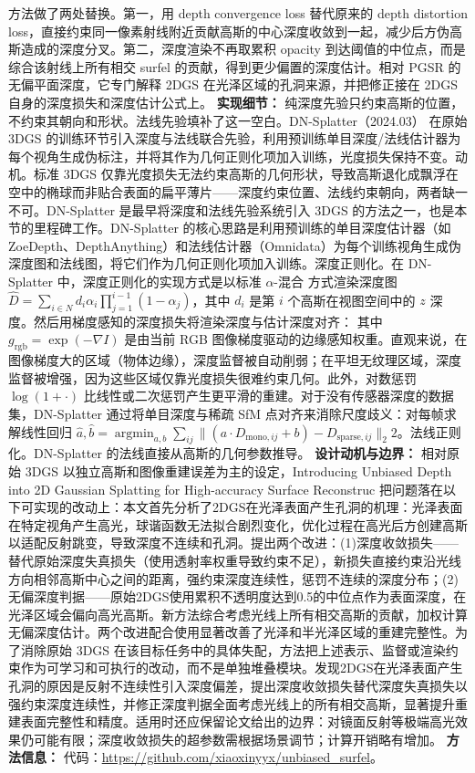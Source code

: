 方法做了两处替换。第一，用 depth convergence loss 替代原来的 depth distortion loss，直接约束同一像素射线附近贡献高斯的中心深度收敛到一起，减少后方伪高斯造成的深度分叉。第二，深度渲染不再取累积 opacity 到达阈值的中位点，而是综合该射线上所有相交 surfel 的贡献，得到更少偏置的深度估计。相对 PGSR 的无偏平面深度，它专门解释 2DGS 在光泽区域的孔洞来源，并把修正接在 2DGS 自身的深度损失和深度估计公式上。
\textbf{实现细节：} 纯深度先验只约束高斯的位置，不约束其朝向和形状。法线先验填补了这一空白。DN-Splatter（2024.03） 在原始 3DGS 的训练环节引入深度与法线联合先验，利用预训练单目深度/法线估计器为每个视角生成伪标注，并将其作为几何正则化项加入训练，光度损失保持不变。动机。标准 3DGS 仅靠光度损失无法约束高斯的几何形状，导致高斯退化成飘浮在空中的椭球而非贴合表面的扁平薄片——深度约束位置、法线约束朝向，两者缺一不可。DN-Splatter 是最早将深度和法线先验系统引入 3DGS 的方法之一，也是本节的里程碑工作。DN-Splatter 的核心思路是利用预训练的单目深度估计器（如 ZoeDepth、DepthAnything）和法线估计器（Omnidata）为每个训练视角生成伪深度图和法线图，将它们作为几何正则化项加入训练。深度正则化。在 DN-Splatter 中，深度正则化的实现方式是以标准 $\alpha$-混合 方式渲染深度图 $\hat{D} = \sum_{i \in N} d_i \alpha_i \prod_{j=1}^{i-1}(1-\alpha_j)$，其中 $d_i$ 是第 $i$ 个高斯在视图空间中的 $z$ 深度。然后用梯度感知的深度损失将渲染深度与估计深度对齐： 其中 $g_{\mathrm{rgb}} = \exp(-\nabla I)$ 是由当前 RGB 图像梯度驱动的边缘感知权重。直观来说，在图像梯度大的区域（物体边缘），深度监督被自动削弱；在平坦无纹理区域，深度监督被增强，因为这些区域仅靠光度损失很难约束几何。此外，对数惩罚 $\log(1+\cdot)$ 比线性或二次惩罚产生更平滑的重建。对于没有传感器深度的数据集，DN-Splatter 通过将单目深度与稀疏 SfM 点对齐来消除尺度歧义：对每帧求解线性回归 $\hat{a}, \hat{b} = \operatorname{argmin}_{a,b} \sum_{ij} \|(a \cdot D_{\mathrm{mono},ij} + b) - D_{\mathrm{sparse},ij}\|_2^{}2$。法线正则化。DN-Splatter 的法线直接从高斯的几何参数推导。
\textbf{设计动机与边界：} 相对原始 3DGS 以独立高斯和图像重建误差为主的设定，Introducing Unbiased Depth into 2D Gaussian Splatting for High-accuracy Surface Reconstruc 把问题落在以下可实现的改动上：本文首先分析了2DGS在光泽表面产生孔洞的机理：光泽表面在特定视角产生高光，球谐函数无法拟合剧烈变化，优化过程在高光后方创建高斯以适配反射跳变，导致深度不连续和孔洞。提出两个改进：(1)深度收敛损失——替代原始深度失真损失（使用透射率权重导致约束不足），新损失直接约束沿光线方向相邻高斯中心之间的距离，强约束深度连续性，惩罚不连续的深度分布；(2)无偏深度判据——原始2DGS使用累积不透明度达到0.5的中位点作为表面深度，在光泽区域会偏向高光高斯。新方法综合考虑光线上所有相交高斯的贡献，加权计算无偏深度估计。两个改进配合使用显著改善了光泽和半光泽区域的重建完整性。为了消除原始 3DGS 在该目标任务中的具体失配，方法把上述表示、监督或渲染约束作为可学习和可执行的改动，而不是单独堆叠模块。发现2DGS在光泽表面产生孔洞的原因是反射不连续性引入深度偏差，提出深度收敛损失替代深度失真损失以强约束深度连续性，并修正深度判据全面考虑光线上的所有相交高斯，显著提升重建表面完整性和精度。适用时还应保留论文给出的边界：对镜面反射等极端高光效果仍可能有限；深度收敛损失的超参数需根据场景调节；计算开销略有增加。
\textbf{方法信息：} 代码：\url{https://github.com/xiaoxinyyx/unbiased_surfel}。
